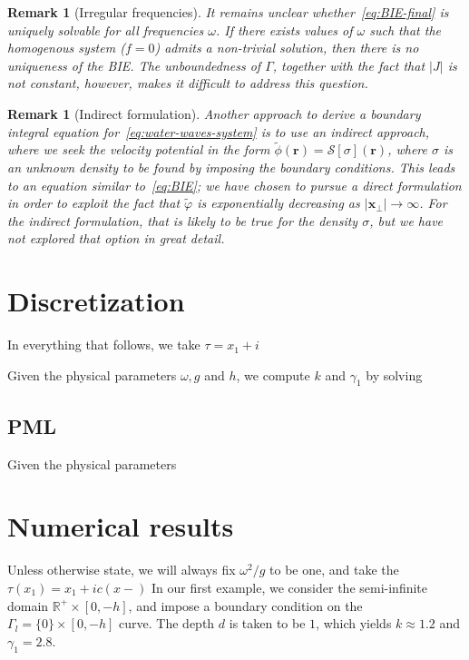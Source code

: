 \documentclass[11pt]{article}
\newcommand{\R}{\mathbb{R}}
\newcommand{\bx}{\mathbf{x}}
\newcommand{\br}{\boldsymbol{r}}
\newcommand{\tvarphi}{\tilde \varphi}
\newtheorem{remark}[theorem]{Remark}
\begin{document}
\begin{remark}[Irregular frequencies]
  It remains unclear whether~\cref{eq:BIE-final} is uniquely solvable for all
  frequencies $\omega$. If there exists values of $\omega$ such that the
  homogenous system ($f=0$) admits a non-trivial solution, then there is no
  uniqueness of the BIE. The unboundedness of $\Gamma$, together with the fact
  that $|J|$ is not constant, however, makes it difficult to address this
  question.
\end{remark}

\begin{remark}[Indirect formulation]
  Another approach to derive a boundary integral equation
  for~\cref{eq:water-waves-system} is to use an \emph{indirect} approach, where
  we seek the velocity potential in the form $\tilde{\phi}(\br) =
  \mathcal{S}[\sigma](\br)$, where $\sigma$ is an unknown density to be found by
  imposing the boundary conditions. This leads to an equation similar
  to~\cref{eq:BIE}; we have chosen to pursue a \emph{direct} formulation in
  order to exploit the fact that $\tvarphi$ is exponentially decreasing as
  $|\bx_\perp| \to \infty$. For the indirect formulation, that is likely to be
  true for the density $\sigma$, but we have not explored that option in great
  detail. 
\end{remark}

\section{Discretization}

In everything that follows, we take $\tau = x_1 + i $

Given the physical parameters $\omega, g$ and $h$, we compute $k$ and $\gamma_1$
by solving 

\subsection{PML}

Given the physical parameters

\section{Numerical results}

Unless otherwise state, we will always fix $\omega^2/g$ to be one, and take the
$\tau(x_1) = x_1 + i c (x-)$ In our first
example, we consider the semi-infinite domain $\R^+ \times [0,-h]$, and impose a
boundary condition on the $\Gamma_l = \{ 0 \} \times [0,-h]$ curve. The depth
$d$ is taken to be $1$, which yields $k \approx 1.2$ and $\gamma_1=2.8$. 
\end{document}
